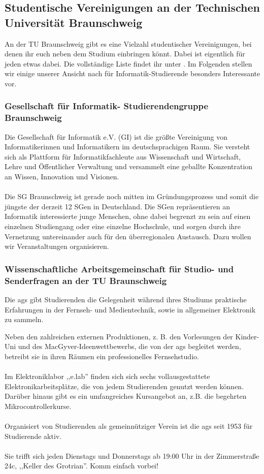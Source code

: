 \subsection{Studentische Vereinigungen an der Technischen Universität
Braunschweig}
\label{vereinigungen}
	An der TU Braunschweig gibt es eine Vielzahl studentischer
	Vereinigungen, bei denen ihr euch neben dem Studium einbringen
	könnt. Dabei ist eigentlich für jeden etwas dabei. Die
	vollständige Liste findet ihr unter 
	. 
	Im Folgenden stellen wir einige unserer Ansicht nach für
	Informatik-Studierende besonders Interessante vor.

	\subsubsection{Gesellschaft für Informatik- Studierendengruppe
	Braunschweig}	
	Die Gesellschaft für Informatik e.V. (GI) ist die größte
	Vereinigung von Informatikerinnen und Informatikern im
	deutschsprachigen Raum. Sie versteht sich als Plattform für
	Informatikfachleute aus Wissenschaft und Wirtschaft, Lehre und
	Öffentlicher Verwaltung und versammelt eine geballte
	Konzentration an Wissen, Innovation und Visionen. \\\\
	 Die SG Braunschweig ist gerade noch mitten im Gründungsprozess
	 und somit die jüngste der derzeit 12 SGen in Deutschland. Die
	 SGen repräsentieren an Informatik interessierte junge Menschen,
	 ohne dabei begrenzt zu sein auf einen einzelnen Studiengang
	 oder eine einzelne Hochschule, und sorgen durch ihre Vernetzung
	 untereinander auch für den überregionalen Austausch. Dazu
	 wollen wir Veranstaltungen organisieren. 

\subsubsection{Wissenschaftliche Arbeitsgemeinschaft für Studio- und Senderfragen an der TU Braunschweig}
Die ags gibt Studierenden die Gelegenheit während ihres Studiums
praktische Erfahrungen in der Fernseh- und Medientechnik, sowie in
allgemeiner Elektronik zu sammeln. 


Neben den zahlreichen externen Produktionen, z.
B. den Vorlesungen der Kinder-Uni und des MacGyver-Ideenwettbewerbs, die
von der ags begleitet werden, betreibt sie in ihren Räumen 
ein professionelles Fernsehstudio. 
\\\\
 Im Elektroniklabor ,,e.lab'' finden sich sich sechs
 vollausgestattete Elektronikarbeitsplätze, die von jedem Studierenden
 genutzt werden können. Darüber hinaus gibt es ein umfangreiches
 Kursangebot an, z.B. die begehrten Mikrocontrollerkurse. 
\\\\
  Organisiert von Studierenden als gemeinnütziger Verein ist die ags
  seit 1953 für Studierende aktiv. 
  \\\\
   Sie trifft sich jeden Dienstags und Donnerstags ab 19:00 Uhr in der
   Zimmerstraße 24c, ,,Keller des Grotrian''. Komm einfach vorbei!

